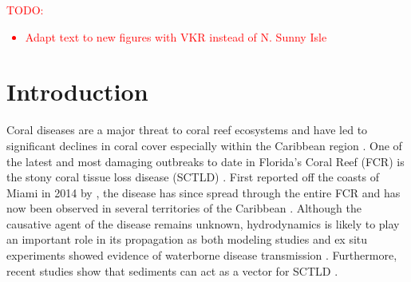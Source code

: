 \documentclass[preprint,12pt,authoryear]{elsarticle}
\newcommand{\todo}[1]{\textcolor{red}{TODO: #1}}
\begin{document}
\linenumbers

\todo{
\begin{itemize}
    \item Adapt text to new figures with VKR instead of N. Sunny Isle
\end{itemize}
}

\section{Introduction}

Coral diseases are a major threat to coral reef ecosystems and have led to significant declines in coral cover especially within the Caribbean region \citep{richardson1998coral, sutherland2004disease, aronson2001white, harvell2007coral, brandt2009dynamics}. One of the latest and most damaging outbreaks to date in Florida's Coral Reef (FCR) is the stony coral tissue loss disease (SCTLD) \citep{noaa2018}. First reported off the coasts of Miami in 2014 by \cite{precht2016unprecedented}, the disease has since spread through the entire FCR \citep{muller2020spatial,dobbelaere2022connecting} and has now been observed in several territories of the Caribbean \citep{kramer2019map, meiling2021variable, estrada2021effects,heres2021ecological}. Although the causative agent of the disease remains unknown, hydrodynamics is likely to play an important role in its propagation as both modeling studies and ex situ experiments showed evidence of waterborne disease transmission \citep{aeby2019pathogenesis,dobbelaere2020coupled,eaton2021measuring, meiling2021variable}. Furthermore, recent studies show that sediments can act as  a vector for SCTLD \citep{rosales2020rhodobacterales, studivan2022reef}.
\end{document}
